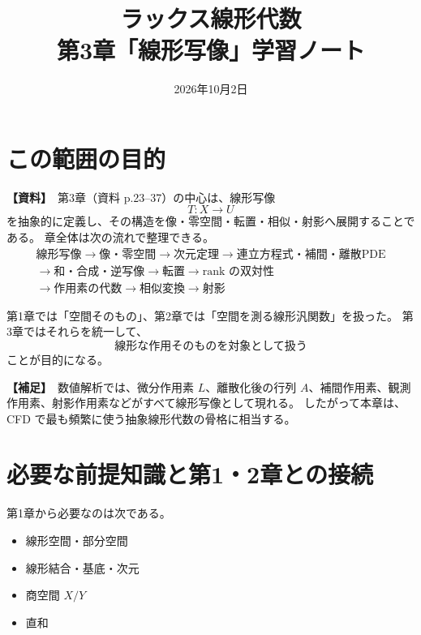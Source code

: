 \documentclass[a4paper,11pt]{ltjsarticle}
\title{\vspace{-1.5em}ラックス線形代数\\第3章「線形写像」学習ノート}
\author{}
\date{2026年10月2日}
\newcommand{\sourceitem}{\textbf{【資料】}}
\newcommand{\suppitem}{\textbf{【補足】}}
\begin{document}
\maketitle
\vspace{-2em}

\begin{center}
\end{center}

\section{この範囲の目的}

\sourceitem\ 第3章（資料 p.23--37）の中心は、線形写像
\[
T:X\to U
\]
を抽象的に定義し、その構造を像・零空間・転置・相似・射影へ展開することである。
章全体は次の流れで整理できる。
\[
\boxed{
\begin{array}{c}
\text{線形写像}
\to \text{像・零空間}
\to \text{次元定理}
\to \text{連立方程式・補間・離散PDE}\\[2mm]
\to \text{和・合成・逆写像}
\to \text{転置}
\to \text{rank の双対性}\\[2mm]
\to \text{作用素の代数}
\to \text{相似変換}
\to \text{射影}
\end{array}}
\]

第1章では「空間そのもの」、第2章では「空間を測る線形汎関数」を扱った。
第3章ではそれらを統一して、
\[
\boxed{\text{線形な作用そのものを対象として扱う}}
\]
ことが目的になる。

\suppitem\ 数値解析では、微分作用素 $L$、離散化後の行列 $A$、補間作用素、観測作用素、射影作用素などがすべて線形写像として現れる。
したがって本章は、CFD で最も頻繁に使う抽象線形代数の骨格に相当する。

\section{必要な前提知識と第1・2章との接続}

第1章から必要なのは次である。
\begin{itemize}
  \item 線形空間・部分空間
  \item 線形結合・基底・次元
  \item 商空間 $X/Y$
  \item 直和
\end{itemize}
\end{document}
